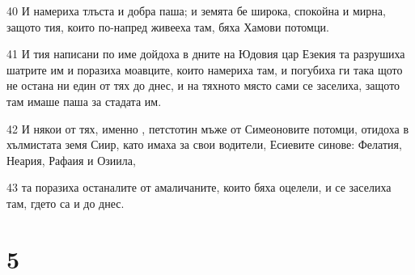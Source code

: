 \par 40 И намериха тлъста и добра паша; и земята бе широка, спокойна и мирна, защото тия, които по-напред живееха там, бяха Хамови потомци.
\par 41 И тия написани по име дойдоха в дните на Юдовия цар Езекия та разрушиха шатрите им и поразиха моавците, които намериха там, и погубиха ги така щото не остана ни един от тях до днес, и на тяхното място сами се заселиха, защото там имаше паша за стадата им.
\par 42 И някои от тях, именно , петстотин мъже от Симеоновите потомци, отидоха в хълмистата земя Сиир, като имаха за свои водители, Есиевите синове: Фелатия, Неария, Рафаия и Озиила,
\par 43 та поразиха останалите от амаличаните, които бяха оцелели, и се заселиха там, гдето са и до днес.

\chapter{5}

